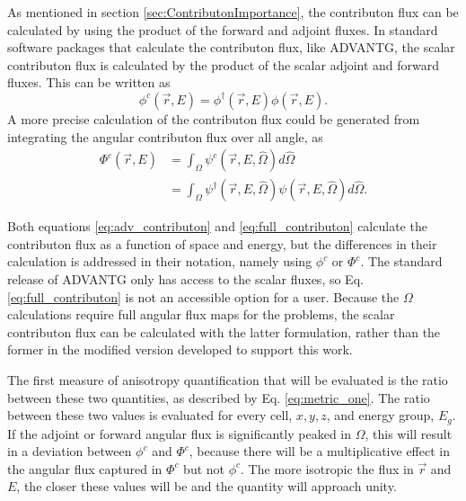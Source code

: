 As mentioned in section \ref{sec:ContributonImportance}, the
contributon flux can be calculated by using
the product of the forward and adjoint fluxes. In standard software packages
that calculate the contributon flux, like ADVANTG, the scalar contributon flux is calculated by the product
of the scalar adjoint and forward fluxes. This can be written as
%
\begin{equation}
  \phi^{c}(\vec {r} ,E)  = \phi^{\dagger}(\vec {r} ,E)\phi(\vec {r} ,E) .
\label{eq:adv_contributon}
\end{equation}
%
A more precise calculation of the contributon flux could be generated from
integrating the angular contributon flux over all angle, as
%
\begin{equation}
  \begin{split}
    \Phi^{c}(\vec {r} ,E)  & = \int_{\Omega}{\psi^{c}(\vec{r}, E, \hat \Omega)}
                               d\hat\Omega \\
             & = \int_{\Omega}{\psi^{\dagger}(\vec{r}, E, \hat\Omega)
                 \psi(\vec{r}, E, \hat\Omega)} d\hat\Omega .
  \end{split}
\label{eq:full_contributon}
\end{equation}

Both equations \ref{eq:adv_contributon} and \ref{eq:full_contributon} calculate
the contributon flux as a function of space and energy, but the
differences in their calculation is addressed in their notation, namely using
$\phi^{c}$ or $\Phi^{c}$. The standard release of ADVANTG only has
access to the scalar
fluxes, so Eq. \ref{eq:full_contributon} is not an accessible option for a
user. Because the $\Omega$ calculations require full angular flux maps for the
problems, the scalar contributon flux can be calculated with the latter
formulation, rather than the former in the modified version developed to support
this work.

The first measure of anisotropy quantification that will be evaluated is the
ratio between these two quantities, as described by Eq. \ref{eq:metric_one}.
The ratio between these two values is evaluated for every cell, $x,y,z$, and energy
group, $E_g$.
If the adjoint or forward angular flux is significantly
peaked in $\Omega$, this will result in a deviation between $\phi^{c}$ and
$\Phi^{c}$, because there will be a multiplicative effect in the angular flux
captured in $\Phi^{c}$ but not $\phi^{c}$. The more isotropic the
flux in $\vec{r}$ and $E$, the closer these
values will be and the quantity will approach unity.

